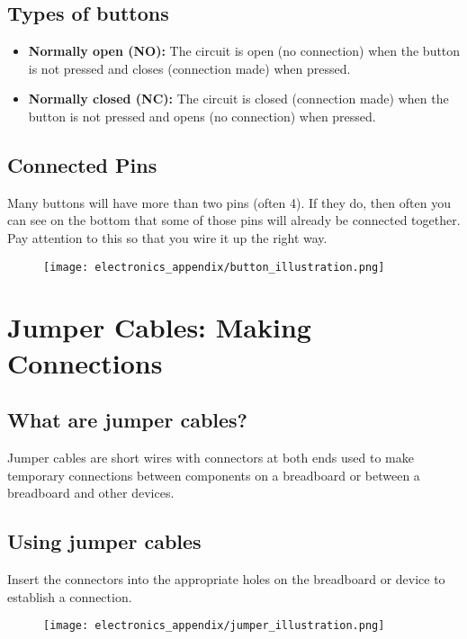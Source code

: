 \subsection{Types of buttons}
\begin{itemize}
    \item \textbf{Normally open (NO):} The circuit is open (no connection) when the button is not
    pressed and closes (connection made) when pressed.
    \item \textbf{Normally closed (NC):} The circuit is closed (connection made) when the button is
    not pressed and opens (no connection) when pressed.
\end{itemize}

\subsection{Connected Pins}
Many buttons will have more than two pins (often 4). If they do, then often you can see on the bottom
that some of those pins will already be connected together. Pay attention to this so that you wire it
up the right way.

\begin{figure}[H]
\centering
    \texttt{[image: electronics\_appendix/button\_illustration.png]}
\end{figure}

\section{Jumper Cables: Making Connections}
\subsection{What are jumper cables?}
Jumper cables are short wires with connectors at both ends used to make temporary connections between
components on a breadboard or between a breadboard and other devices.

\subsection{Using jumper cables}
Insert the connectors into the appropriate holes on the breadboard or device to establish a connection.

\begin{figure}[H]
\centering
    \texttt{[image: electronics\_appendix/jumper\_illustration.png]}
\end{figure}

